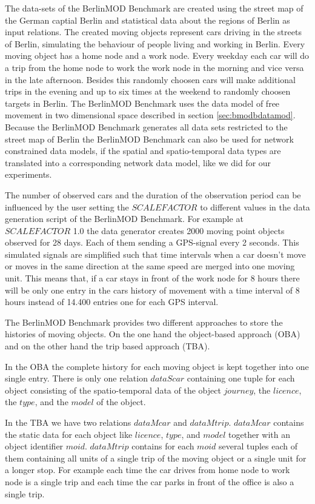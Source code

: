 \documentclass[a4paper]{article}
\newcommand{\bmodb} {BerlinMOD Benchmark}
\begin{document}
The data-sets of the \bmodb{} are created using the street map of the German
captial Berlin \cite{bbike} and statistical data about the regions of Berlin
\cite{bevberlin,berlinstadtatlas} as input relations.
The created moving objects represent cars driving in the streets of Berlin,
simulating the behaviour of people living and working in Berlin.
Every moving object has a home node and a work node. Every weekday each car will
do a trip from the home node to work the work node in the morning and vice versa
in the late afternoon. Besides this randomly choosen cars will make additional
trips in the evening and up to six times at the weekend to randomly choosen
targets in Berlin. The \bmodb{} uses the data model of free movement in two
dimensional space described in section \ref{sec:bmodbdatamod}. Because the \bmodb{}
generates all data sets restricted to the street map of Berlin the \bmodb{} can
also be used for network constrained data models, if the spatial and spatio-temporal
data types are translated into a corresponding network data model, like we did
for our experiments.

The number of observed cars and the duration of the observation period can be
influenced by the user setting the $SCALEFACTOR$ to different values in the data
generation script of the \bmodb{}. For example at $SCALEFACTOR$ 1.0 the data generator
creates 2000 moving point objects observed for 28 days. Each of them sending a
GPS-signal every 2 seconds. This simulated signals are simplified such that time
intervals when a car doesn't move or moves in the same direction at the same
speed are merged into one moving unit. This means that, if a car stays in front
of the work node for 8 hours there will be only one entry in the cars
history of movement with a time interval of 8 hours instead of 14.400 entries
one for each GPS interval.

The \bmodb{} provides two different approaches to store the histories of moving
objects. On the one hand the object-based approach (OBA) and on the other hand
the trip based approach (TBA).

In the OBA the complete history for each moving object is kept together into
one single entry. There is only one relation $dataScar$
containing one tuple for each object consisting of the spatio-temporal data of
the object $journey$, the $licence$, the $type$, and the $model$ of the object.

In the TBA we have two relations $dataMcar$ and $dataMtrip$. $dataMcar$ contains
the static data for each object like $licence$, $type$, and $model$ together with
an object identifier $moid$. $dataMtrip$ contains for each $moid$ several tuples
each of them containing all units of a single trip of the moving object or a
single unit for a longer stop. For example each time the car drives from home node
to work node is a single trip and each time the car parks in front of the office
is also a single trip.
\end{document}
